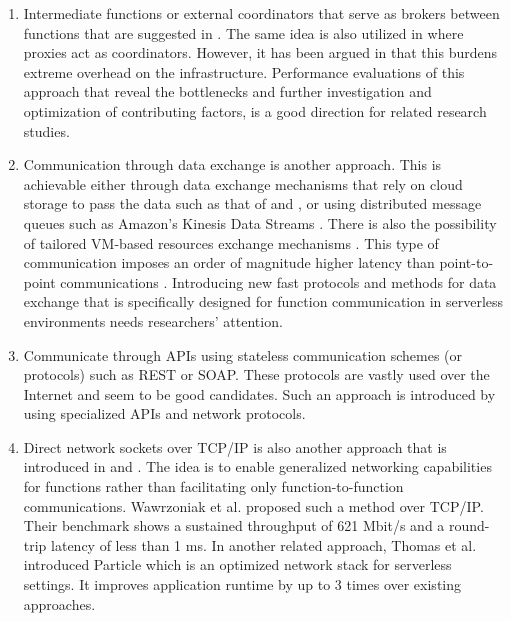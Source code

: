 \begin{enumerate}
\item Intermediate functions or external coordinators that serve as brokers between functions that are suggested in . The same idea is also utilized in   where proxies act as coordinators. However, it has been argued in  that this burdens extreme overhead on the infrastructure.  Performance evaluations of this approach that reveal the bottlenecks and further investigation and optimization of contributing factors, is a good direction for related research studies.
\item Communication through data exchange is another approach. This is achievable either through data exchange mechanisms that rely on cloud storage to pass the data such as that of  and , or using distributed message queues such as Amazon's Kinesis Data Streams . There is also the possibility of tailored VM-based resources exchange mechanisms . This type of communication imposes an order of magnitude higher latency than point-to-point communications .  Introducing new fast protocols and methods for data exchange that is specifically designed for function communication in serverless environments needs researchers' attention. 
\item Communicate through APIs using stateless communication schemes (or protocols) such as REST or SOAP. These protocols are vastly used over the Internet and seem to be good candidates. Such an approach is introduced by  using specialized APIs and network protocols.
\item Direct network sockets over TCP/IP is also another approach that is introduced in  and . The idea is to enable generalized networking capabilities for functions rather than facilitating only function-to-function communications. Wawrzoniak et al.  proposed such a method over TCP/IP. Their benchmark shows a sustained throughput of 621 Mbit/s and a round-trip latency of less than 1 ms. In another related approach, Thomas et al. introduced Particle  which is an optimized network stack for serverless settings. It improves application runtime by up to 3 times over existing approaches.
\end{enumerate}

